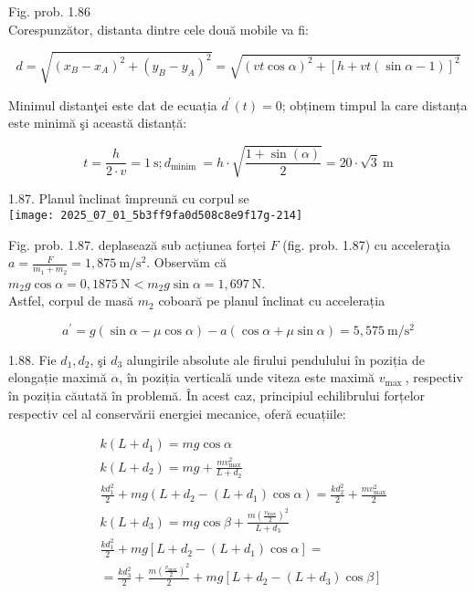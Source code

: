 Fig. prob. 1.86\\
Corespunzător, distanta dintre cele două mobile va fi:

$$
d=\sqrt{\left(x_{B}-x_{A}\right)^{2}+\left(y_{B}-y_{A}\right)^{2}}=\sqrt{(v t \cos \alpha)^{2}+[h+v t(\sin \alpha-1)]^{2}}
$$

Minimul distanţei este dat de ecuația $d^{\prime}(t)=0$; obținem timpul la care distanța este minimă şi această distanță:

$$
t=\frac{h}{2 \cdot v}=1 \mathrm{~s} ; d_{\text {minim }}=h \cdot \sqrt{\frac{1+\sin (\alpha)}{2}}=20 \cdot \sqrt{3} \mathrm{~m}
$$

1.87. Planul înclinat împreună cu corpul se\\
\texttt{[image: 2025\_07\_01\_5b3ff9fa0d508c8e9f17g-214]}

Fig. prob. 1.87. deplasează sub acțiunea forței $F$ (fig. prob. 1.87) cu acceleraţia $a=\frac{F}{m_{1}+m_{2}}=1,875 \mathrm{~m} / \mathrm{s}^{2}$. Observăm că\\
$m_{2} g \cos \alpha=0,1875 \mathrm{~N}<m_{2} g \sin \alpha=1,697 \mathrm{~N}$.\\
Astfel, corpul de masă $m_{2}$ coboară pe planul înclinat cu accelerația

$$
a^{\prime}=g(\sin \alpha-\mu \cos \alpha)-a(\cos \alpha+\mu \sin \alpha)=5,575 \mathrm{~m} / \mathrm{s}^{2}
$$

1.88. Fie $d_{1}, d_{2}$, şi $d_{3}$ alungirile absolute ale firului pendulului în poziția de elongație maximă $\alpha$, în poziția verticală unde viteza este maximă $v_{\text {max }}$, respectiv\\
în poziția căutată în problemă. În acest caz, principiul echilibrului forțelor respectiv cel al conservării energiei mecanice, oferă ecuațiile:

$$
\begin{aligned}
& k\left(L+d_{1}\right)=m g \cos \alpha \\
& k\left(L+d_{2}\right)=m g+\frac{m v_{\max }^{2}}{L+d_{2}} \\
& \frac{k d_{1}^{2}}{2}+m g\left(L+d_{2}-\left(L+d_{1}\right) \cos \alpha\right)=\frac{k d_{2}^{2}}{2}+\frac{m v_{\max }^{2}}{2} \\
& k\left(L+d_{3}\right)=m g \cos \beta+\frac{m\left(\frac{v_{\max }}{2}\right)^{2}}{L+d_{3}} \\
& \frac{k d_{1}^{2}}{2}+m g\left[L+d_{2}-\left(L+d_{1}\right) \cos \alpha\right]= \\
& =\frac{k d_{3}^{2}}{2}+\frac{m\left(\frac{v_{\max }}{2}\right)^{2}}{2}+m g\left[L+d_{2}-\left(L+d_{3}\right) \cos \beta\right]
\end{aligned}
$$

